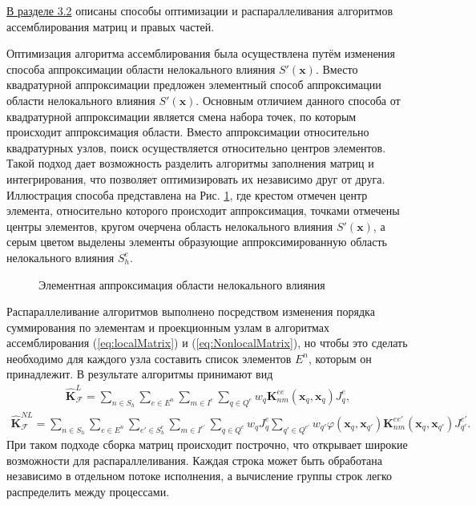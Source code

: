 \underline{В разделе 3.2} описаны способы оптимизации и распараллеливания алгоритмов ассемблирования матриц и правых частей.

Оптимизация алгоритма ассемблирования была осуществлена путём изменения способа аппроксимации области нелокального влияния $S'(\boldsymbol{x})$. Вместо квадратурной аппроксимации предложен элементный способ аппроксимации области нелокального влияния $S'(\boldsymbol{x})$. Основным отличием данного способа от квадратурной аппроксимации является смена набора точек, по которым происходит аппроксимация области. Вместо аппроксимации относительно квадратурных узлов, поиск осуществляется относительно центров элементов. Такой подход дает возможность разделить алгоритмы заполнения матриц и интегрирования, что позволяет оптимизировать их независимо друг от друга. Иллюстрация способа представлена на Рис. \ref{fig:ApproxSE}, где крестом отмечен центр элемента, относительно которого происходит аппроксимация, точками отмечены центры элементов, кругом очерчена область нелокального влияния $S'(\boldsymbol{x})$, а серым цветом выделены элементы образующие аппроксимированную область нелокального влияния $S_h^e$.

\begin{figure}[ht]
    \caption{Элементная аппроксимация области нелокального влияния}\label{fig:ApproxSE}
\end{figure}

Распараллеливание алгоритмов выполнено посредством изменения порядка суммирования по элементам и проекционным узлам в алгоритмах ассемблирования (\ref{eq:localMatrix}) и (\ref{eq:NonlocalMatrix}), но чтобы это сделать необходимо для каждого узла составить список элементов $E^n$, которым он принадлежит. В результате алгоритмы принимают вид
\begin{gather*}
	\widehat{\textbf{K}}^L_{\mathcal{F}} =
	\sum\limits_{n \in S_h}
	\sum\limits_{e \in E^n}
	\sum\limits_{m \in I^e}
	\sum\limits_{q \in Q^e}
	w_q \textbf{K}^{ee}_{nm} (\boldsymbol{x}_q, \boldsymbol{x}_q) J_q^e,
\end{gather*}
\begin{gather}
	\label{eq:ParallelNonlocalMatrix}
	\widehat{\textbf{K}}^{NL}_{\mathcal{F}} =
	\sum\limits_{n \in S_h}
	\sum\limits_{e \in E^n}
	\sum\limits_{e' \in S_h^e}
	\sum\limits_{m \in I^{e'}}
	\sum\limits_{q \in Q^e}
	w_q J_q^e
	\sum\limits_{q' \in Q^{e'}}
	w_{q'} \varphi(\boldsymbol{x}_q, \boldsymbol{x}_{q'}) 
	\textbf{K}_{nm}^{e e'}(\boldsymbol{x}_q, \boldsymbol{x}_{q'}) J_{q'}^{e'}.
\end{gather}
При таком подходе сборка матриц происходит построчно, что открывает широкие возможности для распараллеливания. Каждая строка может быть обработана независимо в отдельном потоке исполнения, а вычисление группы строк легко распределить между процессами.

